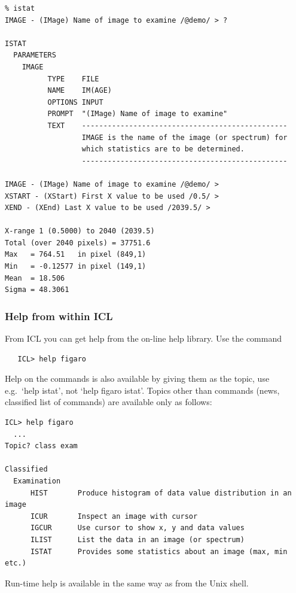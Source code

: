 \documentclass[11pt,twoside]{article}
\newcommand{\htmlref}[2]{#1}
\begin{document}
\begin{verbatim}
% istat
IMAGE - (IMage) Name of image to examine /@demo/ > ?

ISTAT
  PARAMETERS
    IMAGE
          TYPE    FILE
          NAME    IM(AGE)
          OPTIONS INPUT
          PROMPT  "(IMage) Name of image to examine"
          TEXT    ------------------------------------------------
                  IMAGE is the name of the image (or spectrum) for
                  which statistics are to be determined.
                  ------------------------------------------------

IMAGE - (IMage) Name of image to examine /@demo/ >
XSTART - (XStart) First X value to be used /0.5/ >
XEND - (XEnd) Last X value to be used /2039.5/ >

X-range 1 (0.5000) to 2040 (2039.5)
Total (over 2040 pixels) = 37751.6
Max   = 764.51   in pixel (849,1)
Min   = -0.12577 in pixel (149,1)
Mean  = 18.506
Sigma = 48.3061
\end{verbatim}

\subsubsection{\label{gethelpicl}Help from within ICL}

   From ICL you can get help from the on-line help library.  Use the command

\begin{verbatim}
   ICL> help figaro
\end{verbatim}

   Help on the commands is also available by giving them as the topic,
   use e.g.\ `help istat', not `help figaro istat'. Topics other than
   commands (news, classified list of commands) are available only as
   follows:

\begin{verbatim}
ICL> help figaro
  ...
Topic? class exam

Classified
  Examination
      HIST       Produce histogram of data value distribution in an image
      ICUR       Inspect an image with cursor
      IGCUR      Use cursor to show x, y and data values
      ILIST      List the data in an image (or spectrum)
      ISTAT      Provides some statistics about an image (max, min etc.)
\end{verbatim}

   Run-time help is available
\htmlref{in the same way as from the Unix shell.}{gethelpunix}

\end{document}
